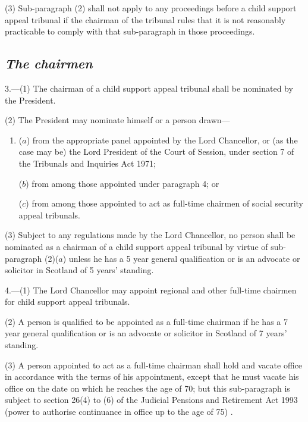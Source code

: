 \documentclass[12pt,a4paper]{article}
\begin{document}
(3) Sub-paragraph (2)  shall not apply to any proceedings before a child support appeal tribunal if the chairman of the tribunal rules that it is not reasonably practicable to comply with that sub-paragraph in those proceedings.

\subsection*{\itshape The chairmen}

3.---(1) The chairman of a child support appeal tribunal shall be nominated by the President.

(2) The President may nominate himself or a person drawn—
\begin{enumerate}\item[]
($a$) from the appropriate panel appointed by the Lord Chancellor, or (as the case may be) the Lord President of the Court of Session, under section 7 of the Tribunals and Inquiries Act 1971;

($b$) from among those appointed under paragraph 4; or

($c$) from among those appointed 
to act as full-time chairmen of social security appeal tribunals.
\end{enumerate}

(3) Subject to any regulations made by the Lord Chancellor, no person shall be nominated as a chairman of a child support appeal tribunal by virtue of sub-paragraph (2)($a$)  unless he has a 5 year general qualification or is an advocate or solicitor in Scotland of 5 years' standing.


\medskip

4.---(1) The Lord Chancellor may appoint regional and other full-time chairmen for child support appeal tribunals.

(2) A person is qualified to be appointed as a full-time chairman if he has a 7 year general qualification or is an advocate or solicitor in Scotland of 7 years' standing.

(3) A person appointed to act as a full-time chairman shall hold and vacate office in accordance with the terms of his appointment, except that he must vacate his office 
on the date on which he reaches the age of 70; but this sub-paragraph is subject to section 26(4) to (6) of the Judicial Pensions and Retirement Act 1993 (power to authorise continuance in office up to the age of 75)%
.
\end{document}
